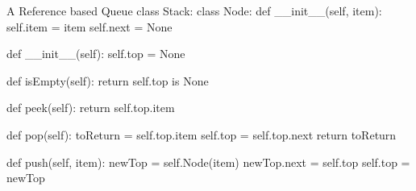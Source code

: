 \begin{pycode}{A Reference based Queue}
class Stack:
	class Node:
		def __init__(self, item):
			self.item = item
			self.next = None

	def __init__(self):
		self.top = None

	def isEmpty(self):
		return self.top is None
	
	def peek(self):
		return self.top.item
	
	def pop(self):
		toReturn = self.top.item
		self.top = self.top.next
		return toReturn
	
	def push(self, item):
		newTop = self.Node(item)
		newTop.next = self.top
		self.top = newTop
\end{pycode}




%
%
%
%
%
%
%
%	
%	
%	
%	
%	
%	
%
%

